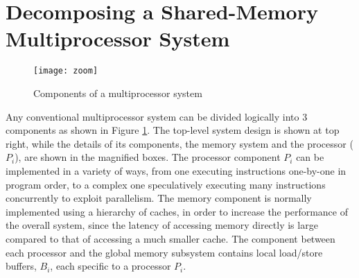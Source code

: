 %
%
%
%
\section{Decomposing a Shared-Memory Multiprocessor System}
\label{sec:store-atomicity}

\begin{figure}
\centering
\texttt{[image: zoom]}
\caption{Components of a multiprocessor system}
\label{zoom}
\end{figure}

Any conventional multiprocessor system can be divided logically into 3 components as shown in Figure \ref{zoom}. 
The top-level system design is shown at top right, while the details of its components, the memory system and the processor ($P_i$), are shown in the magnified boxes. The processor component $P_i$ can be implemented in a variety of ways, from one executing instructions one-by-one in program order, to a complex one speculatively executing many instructions concurrently to exploit parallelism. The memory component is normally implemented using a hierarchy of caches, in order to increase the performance of the overall system, since the latency of accessing memory directly is large compared to that of accessing a much smaller cache. The component between each processor and the global memory subsystem contains local load/store buffers, $B_i$, each specific to a processor $P_i$. 

